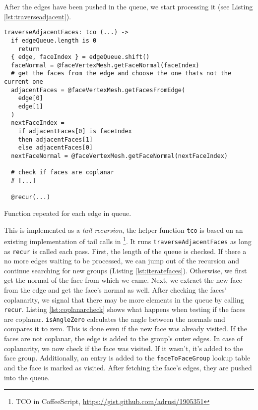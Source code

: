\documentclass[../ClassicThesis.tex]{subfiles}
\begin{document}
After the edges have been pushed in the queue, we start processing it (see Listing \ref{lst:traverseadjacent}).  

\begin{listing}[ht]
\begin{verbatim}
traverseAdjacentFaces: tco (...) ->
  if edgeQueue.length is 0
    return
  { edge, faceIndex } = edgeQueue.shift()
  faceNormal = @faceVertexMesh.getFaceNormal(faceIndex)
  # get the faces from the edge and choose the one thats not the current one
  adjacentFaces = @faceVertexMesh.getFacesFromEdge(
    edge[0]
    edge[1]
  )
  nextFaceIndex =
    if adjacentFaces[0] is faceIndex
    then adjacentFaces[1]
    else adjacentFaces[0]
  nextFaceNormal = @faceVertexMesh.getFaceNormal(nextFaceIndex)
 
  # check if faces are coplanar
  # [...]

  @recur(...)
\end{verbatim}
\caption{Function repeated for each edge in queue.}
\label{lst:traverseadjacent}
\end{listing}


This is implemented as a \emph{tail recursion}, the helper function \texttt{tco} is based on an existing implementation of tail calls in \coffeescript\footnote{TCO in CoffeeScript, \url{https://gist.github.com/adrusi/1905351}}. It runs \texttt{traverseAdjacentFaces} as long as \texttt{recur} is called each pass. First, the length of the queue is checked. If there a no more edges waiting to be processed, we can jump out of the recursion and continue searching for new groups (Listing \ref{lst:iteratefaces}). Otherwise, we first get the normal of the face from which we came. Next, we extract the new face from the edge and get the face's normal as well. After checking the faces' coplanarity, we signal that there may be more elements in the queue by calling \texttt{recur}.
Listing \ref{lst:coplanarcheck} shows what happens when testing if the faces are coplanar. \texttt{isAngleZero} calculates the angle between the normals and compares it to zero. This is done even if the new face was already visited. If the faces are not coplanar, the edge is added to the group's outer edges. In case of coplanarity, we now check if the face was visited. If it wasn't, it's added to the face group. Additionally, an entry is added to the \texttt{faceToFaceGroup} lookup table and the face is marked as visited. After fetching the face's edges, they are pushed into the queue.
\end{document}
